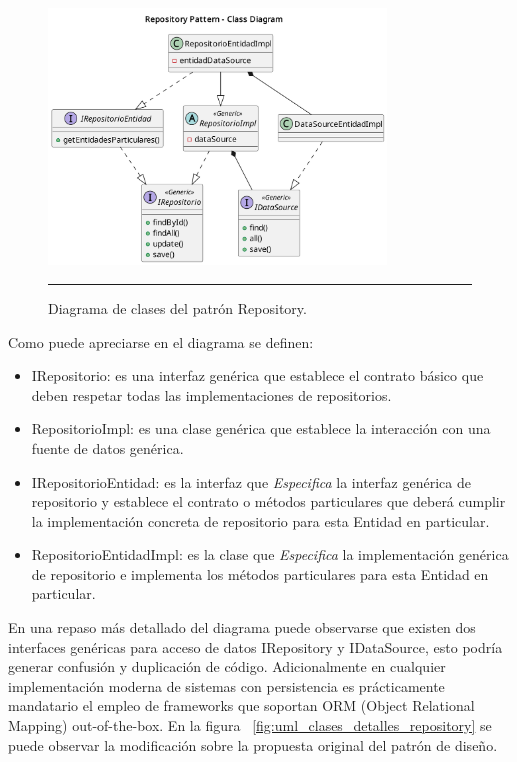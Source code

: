 \begin{figure}[htbp]
	\centering
	\includegraphics[width=0.8\textwidth]{Figures/design/CLASS_repository_def.png}
	\rule{35em}{1pt}
	\caption[Repository Pattern Class Diagram]{Diagrama de clases del patrón Repository.}
	\label{fig:uml_clases_repository}
\end{figure}

Como puede apreciarse en el diagrama se definen:
\begin{itemize}
	\item IRepositorio: es una interfaz genérica que establece el contrato básico que deben respetar todas las implementaciones de repositorios.
	\item RepositorioImpl: es una clase genérica que establece la interacción con una fuente de datos genérica.
	\item IRepositorioEntidad: es la interfaz que \textit{Especifica} la interfaz genérica de repositorio y establece el contrato o métodos particulares que deberá cumplir la implementación concreta de repositorio para esta Entidad en particular.
	\item RepositorioEntidadImpl: es la clase que \textit{Especifica} la implementación genérica de repositorio e implementa los métodos particulares para esta Entidad en particular.
\end{itemize}

En una repaso más detallado del diagrama puede observarse que existen dos interfaces genéricas para acceso de datos IRepository y IDataSource, esto podría generar confusión y duplicación de código. Adicionalmente en cualquier implementación moderna de sistemas con persistencia es prácticamente mandatario el empleo de frameworks que soportan ORM (Object Relational Mapping) out-of-the-box.
En la figura ~\ref{fig:uml_clases_detalles_repository} se puede observar la modificación sobre la propuesta original del patrón de diseño.

